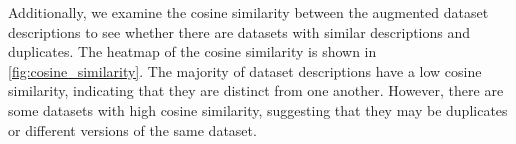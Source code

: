 
Additionally, we examine the cosine similarity between the augmented dataset descriptions to see whether there are datasets with similar descriptions and duplicates. The heatmap of the cosine similarity is shown in \cref{fig:cosine_similarity}. The majority of dataset descriptions have a low cosine similarity, indicating that they are distinct from one another. However, there are some datasets with high cosine similarity, suggesting that they may be duplicates or different versions of the same dataset.


\begin{figure}[h]
    \centering
    \hfill
    \caption{}
    \label{fig:dataset_features_and_similarity}
\end{figure}


